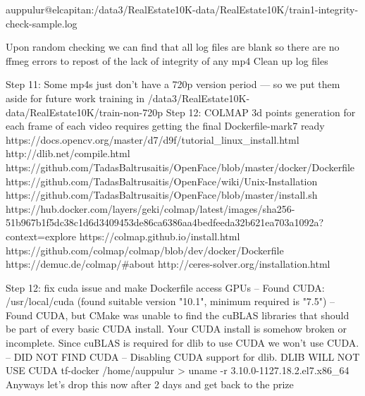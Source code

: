 auppulur@elcapitan:/data3/RealEstate10K-data/RealEstate10K/train1-integrity-check-sample.log


Upon random checking we can find that all log files are blank so there are no ffmeg errors to repost of the lack of integrity of any mp4 
Clean up log files
 

Step 11: Some mp4s just don’t have a 720p version period — so we put them aside for future work training in /data3/RealEstate10K-data/RealEstate10K/train-non-720p
Step 12: COLMAP 3d points generation for each frame of each video requires getting the final Dockerfile-mark7 ready
https://docs.opencv.org/master/d7/d9f/tutorial_linux_install.html
http://dlib.net/compile.html
https://github.com/TadasBaltrusaitis/OpenFace/blob/master/docker/Dockerfile
https://github.com/TadasBaltrusaitis/OpenFace/wiki/Unix-Installation
https://github.com/TadasBaltrusaitis/OpenFace/blob/master/install.sh
https://hub.docker.com/layers/geki/colmap/latest/images/sha256-51b967b1f5dc38c1d6d3409453de86ca6386aa4bedfeeda32b621ea703a1092a?context=explore
https://colmap.github.io/install.html
https://github.com/colmap/colmap/blob/dev/docker/Dockerfile
https://demuc.de/colmap/#about
http://ceres-solver.org/installation.html




  Step 12: fix cuda issue and make Dockerfile access GPUs
-- Found CUDA: /usr/local/cuda (found suitable version "10.1", minimum required is "7.5") 
-- Found CUDA, but CMake was unable to find the cuBLAS libraries that should be part of every basic CUDA install. Your CUDA install is somehow broken or incomplete. Since cuBLAS is required for dlib to use CUDA we won't use CUDA.
-- DID NOT FIND CUDA
-- Disabling CUDA support for dlib.  DLIB WILL NOT USE CUDA
tf-docker /home/auppulur > uname -r
3.10.0-1127.18.2.el7.x86_64
Anyways let's drop this now after 2 days and get back to the prize




